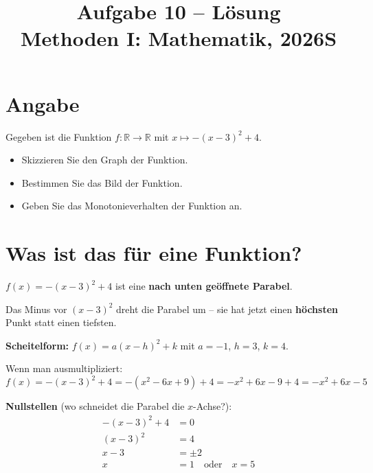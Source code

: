 \documentclass[12pt, a4paper]{article}
\title{\textbf{Aufgabe 10 -- Lösung} \\ Methoden I: Mathematik, 2026S}
\author{}
\date{}
\begin{document}
\maketitle

\section*{Angabe}

Gegeben ist die Funktion $f : \mathbb{R} \to \mathbb{R}$ mit $x \mapsto -(x - 3)^2 + 4$.

\begin{itemize}
    \item Skizzieren Sie den Graph der Funktion.
    \item Bestimmen Sie das Bild der Funktion.
    \item Geben Sie das Monotonieverhalten der Funktion an.
\end{itemize}

\section*{Was ist das für eine Funktion?}

$f(x) = -(x - 3)^2 + 4$ ist eine \textbf{nach unten geöffnete Parabel}.

Das Minus vor $(x-3)^2$ dreht die Parabel um -- sie hat jetzt einen \textbf{höchsten} Punkt statt einen tiefsten.

\textbf{Scheitelform:} $f(x) = a(x - h)^2 + k$ mit $a = -1$, $h = 3$, $k = 4$.

\begin{center}
\end{center}

Wenn man ausmultipliziert:
\[
    f(x) = -(x-3)^2 + 4 = -(x^2 - 6x + 9) + 4 = -x^2 + 6x - 9 + 4 = -x^2 + 6x - 5
\]

\textbf{Nullstellen} (wo schneidet die Parabel die $x$-Achse?):
\begin{align*}
    -(x-3)^2 + 4 &= 0 \\
    (x-3)^2 &= 4 \\
    x - 3 &= \pm 2 \\
    x &= 1 \quad \text{oder} \quad x = 5
\end{align*}
\end{document}
